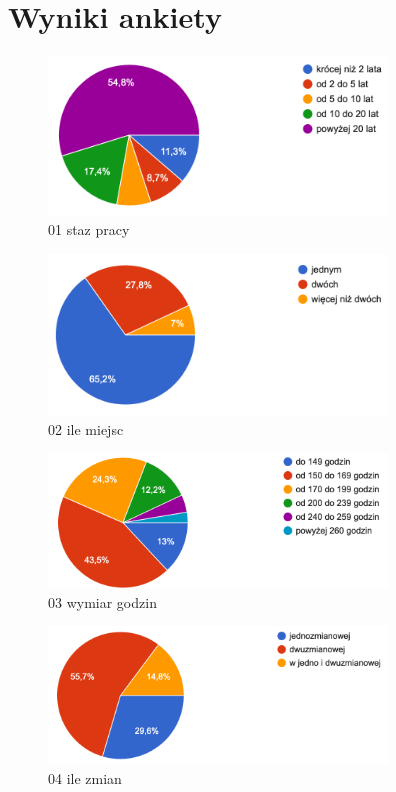 \documentclass[a4paper,12pt,twoside,openany]{report}
\begin{document}
\newpage


\section{Wyniki ankiety}

\begin{figure}
    \includegraphics[width=9cm]{wyniki/01_staz_pracy}
    \caption{ 01 staz pracy }
\end{figure}

\begin{figure}
    \includegraphics[width=9cm]{wyniki/02_ile_miejsc}
    \caption{ 02 ile miejsc }
\end{figure}

\begin{figure}
    \includegraphics[width=9cm]{wyniki/03_wymiar_godzin}
    \caption{ 03 wymiar godzin }
\end{figure}

\begin{figure}
    \includegraphics[width=9cm]{wyniki/04_ile_zmian}
    \caption{ 04 ile zmian }
\end{figure}
\end{document}
